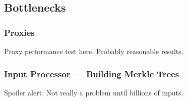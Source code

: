 \subsection{Bottlenecks}%
\label{sub:bottlenecks}

\subsubsection{Proxies}%
\label{ssub:proxies}
Proxy performance test here.
Probably reasonable results.


\subsubsection{Input Processor --- Building Merkle Trees}%
\label{ssub:input_processor_building_merkle_trees}
Spoiler alert: Not really a problem until billions of inputs.

